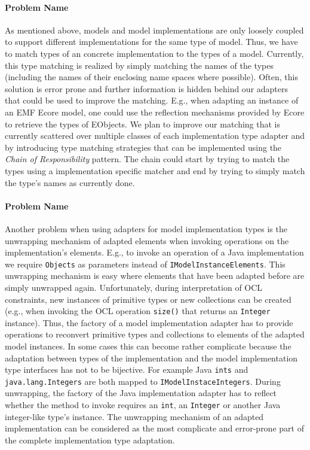 	\paragraph{Problem Name}
	As mentioned above, models and model implementations are only loosely 
	coupled to support different implementations for the same type of model.
	 Thus, we have to match types of an concrete implementation to
	the types of a model. Currently, this type matching is realized by simply 
	matching the names of the types (including the names of 
	their enclosing name spaces where possible). Often, this solution is error 
	prone and further information is hidden behind our adapters that could be 
	used to improve the matching. E.g., when adapting an instance of an EMF 
	Ecore model, one could use the reflection mechanisms provided by Ecore to
	retrieve the types of EObjects. We plan to improve our matching
	that is currently scattered over multiple classes of each implementation type 
	adapter and by introducing type matching strategies that 
	can be implemented using the \textit{Chain of Responsibility} 
	pattern\cite{gamma:dp}. The chain could start by trying to match the 
	types using a implementation specific matcher and end by trying to 
	simply match the type's names as currently done.
	
	\paragraph{Problem Name}
	Another problem when using adapters for model implementation types 
	is the unwrapping mechanism of adapted elements when invoking operations 
	on the implementation's elements. E.g., to invoke an operation of a Java 
	implementation we require \texttt{Objects} as parameters instead of 
	\texttt{IModelInstanceElements}. This unwrapping mechanism is easy 
	where elements that have been adapted before are simply unwrapped 
	again. Unfortunately, during interpretation of OCL constraints, 
	new instances of primitive types or new collections can be created 
	(e.g., when invoking the OCL operation \texttt{size()} that 
	returns an \texttt{Integer} instance). Thus, the factory of a 
	model implementation adapter has to provide operations to reconvert 
	primitive types and collections to elements of the adapted model 
	instances. In some cases this can become rather complicate because 
	the adaptation between types of the implementation and the model 
	implementation type interfaces has not to be bijective. For 
	example Java \texttt{ints} and \texttt{java.lang.Integers} are 
	both mapped to \texttt{IModelInstaceIntegers}. During unwrapping, 
	the factory of the Java implementation adapter has to reflect 
	whether the method to invoke requires an \texttt{int}, an 
	\texttt{Integer} or another Java integer-like type's instance.
	 The unwrapping mechanism of an adapted implementation 
	 can be considered as the most complicate and error-prone part 
	 of the complete implementation type adaptation. 



